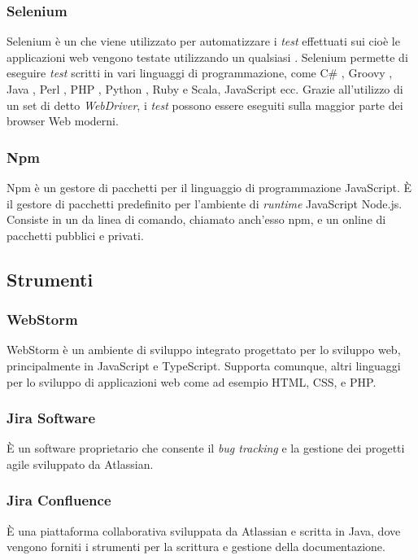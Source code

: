 \subsubsection*{Selenium}
Selenium è un   che viene utilizzato per automatizzare i \emph{test} effettuati sui  cioè le applicazioni web vengono testate utilizzando un qualsiasi . Selenium permette di eseguire \emph{test} scritti in vari linguaggi di programmazione, come C\# , Groovy , Java , Perl , \gls{PHP} , Python , Ruby e Scala, JavaScript ecc. Grazie all'utilizzo di un set di 
 detto \emph{WebDriver}, i \emph{test} possono essere eseguiti sulla maggior parte dei browser Web moderni.

\subsubsection*{Npm}
Npm è un gestore di pacchetti per il linguaggio di programmazione JavaScript. È il gestore di pacchetti predefinito per l'ambiente di \emph{runtime} JavaScript Node.js. Consiste in un 
 da linea di comando, chiamato anch'esso npm, e un  online di pacchetti pubblici e privati.

\subsection{Strumenti}

\subsubsection*{WebStorm}
WebStorm è un ambiente di sviluppo integrato progettato per lo sviluppo web, principalmente in JavaScript e TypeScript. Supporta comunque, altri linguaggi per lo sviluppo di applicazioni web come ad esempio \gls{HTML}, \gls{CSS}, e \gls{PHP}.

\subsubsection{Jira Software}
È un software proprietario che consente il \emph{bug tracking} e la gestione dei progetti agile sviluppato da Atlassian.

\subsubsection{Jira Confluence}
È una piattaforma collaborativa sviluppata da Atlassian e scritta in Java, dove vengono forniti i strumenti per la scrittura e gestione della documentazione.

